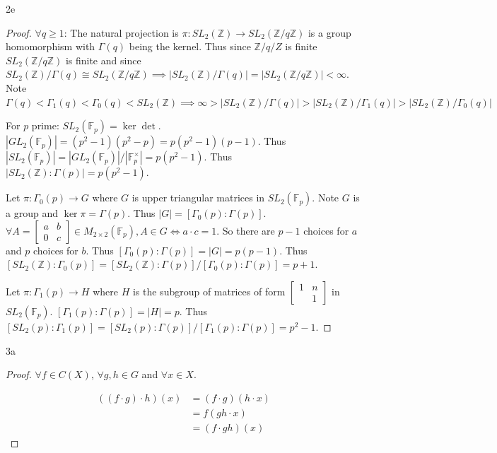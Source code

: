 \documentclass{article}
\newcommand{\Z}{\mathbb{Z}}
\newcommand{\F}{\mathbb{F}}
\newcommand{\abs}[1]{\left\lvert #1\right\rvert}
\begin{document}
\begin{PROB}{2e}\label{Problem 2e.}
\end{PROB}
\begin{proof}
    $\forall q \geq 1$:  
    The natural projection is $\pi: SL_2(\Z) \to SL_2(\Z / q \Z)$ is a group homomorphism with $\Gamma(q)$ being the kernel. Thus since $\Z / q /Z$ is finite $SL_2(\Z / q\Z)$ is finite and since  $SL_2(\Z) / \Gamma(q) \cong SL_2(\Z / q \Z)\implies \abs{SL_2(\Z) / \Gamma(q)} = \abs{SL_2(\Z / q \Z)} < \infty$. Note $\Gamma(q) < \Gamma_1(q) < \Gamma_0(q) < SL_2(\Z) \implies \infty > \abs{SL_2(\Z) / \Gamma(q)} > \abs{SL_2(\Z) / \Gamma_1(q)} > \abs{SL_2(\Z) / \Gamma_0(q)}$ 
    
    
    For $p$ prime: $SL_2(\F_p) = \ker \det$. $\abs{GL_2(\F_p)} = (p^2 - 1)(p^2 - p) = p(p^2 - 1)(p - 1)$. Thus $\abs{SL_2(\F_p)} = \abs{GL_2(\F_p)} / \abs{\F^\times_p} = p(p^2 - 1)$. Thus $\abs{SL_2(\Z) : \Gamma(p)} = p(p^2 - 1)$. 
    
    Let $\pi : \Gamma_0(p) \to G$ where $G$ is upper triangular matrices in $SL_2(\F_p)$. Note $G$ is a group and $\ker \pi = \Gamma(p)$. Thus $\abs{G} = [\Gamma_0(p) : \Gamma(p)]$. $\forall A = \begin{bmatrix}
        a & b \\ 0 & c
    \end{bmatrix} \in M_{2 \times 2}(\F_p), A \in G \iff a \cdot c = 1$. So there are $p - 1$ choices for $a$ and $p$ choices for $b$. Thus $[\Gamma_0(p) : \Gamma(p)] = \abs{G} = p(p - 1)$. Thus $[SL_2(\Z) : \Gamma_0(p)] = [SL_2(\Z) : \Gamma(p)] / [\Gamma_0(p) : \Gamma(p)] = p + 1$. 
    
    Let $\pi: \Gamma_1(p) \to H$ where $H$ is the subgroup of matrices of form $\begin{bmatrix}
        1 & n \\ & 1
    \end{bmatrix}$ in $SL_2(\F_p)$. $[\Gamma_1(p) : \Gamma(p)] = \abs{H} = p$. Thus $[SL_2(p) : \Gamma_1(p)] = [SL_2(p) : \Gamma(p)] / [\Gamma_1(p) : \Gamma(p)] = p^2 - 1$.      
\end{proof}

\bigskip

\begin{PROB}{3a}\label{Problem 3a.}
\end{PROB}
\begin{proof}
    $\forall f \in C(X)$, $\forall g, h \in G$ and $\forall x \in X$.
    
    \begin{align*}
        ((f \cdot g) \cdot h)(x) &= (f \cdot g)(h \cdot x) \\
        &= f(gh \cdot x) \\
        &= (f \cdot gh)(x)
    \end{align*}
\end{proof}
\end{document}
